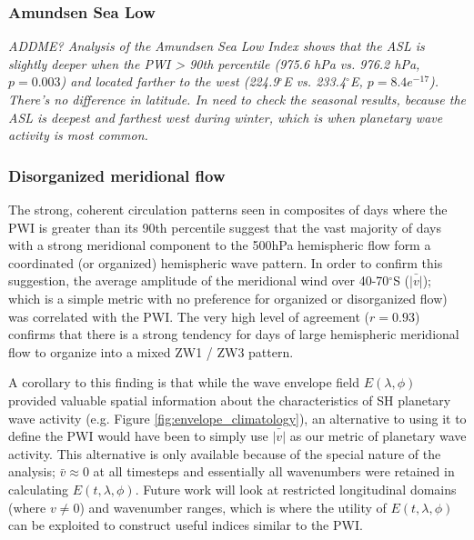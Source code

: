 \subsubsection{Amundsen Sea Low}

\textit{ADDME? Analysis of the Amundsen Sea Low Index \citep{Turner2013} shows that the ASL is slightly deeper when the PWI > 90th percentile (975.6 hPa vs. 976.2 hPa, $p = 0.003$) and located farther to the west (224.9$^{\circ}$E vs. 233.4$^{\circ}$E, $p = 8.4e^{-17}$). There's no difference in latitude.  In need to check the seasonal results, because the ASL is deepest and farthest west during winter, which is when planetary wave activity is most common.}  

\subsubsection{Disorganized meridional flow}

The strong, coherent circulation patterns seen in composites of days where the PWI is greater than its 90th percentile suggest that the vast majority of days with a strong meridional component to the 500hPa hemispheric flow form a coordinated (or organized) hemispheric wave pattern. In order to confirm this suggestion, the average amplitude of the meridional wind over 40-70$^{\circ}$S ($\bar{|v|}$); which is a simple metric with no preference for organized or disorganized flow) was correlated with the PWI. The very high level of agreement ($r = 0.93$) confirms that there is a strong tendency for days of large hemispheric meridional flow to organize into a mixed ZW1 / ZW3 pattern. 

A corollary to this finding is that while the wave envelope field $E(\lambda,\phi)$ provided valuable spatial information about the characteristics of SH planetary wave activity (e.g. Figure \ref{fig:envelope_climatology}), an alternative to using it to define the PWI would have been to simply use $\bar{|v|}$ as our metric of planetary wave activity. This alternative is only available because of the special nature of the analysis; $\bar{v} \approx 0$ at all timesteps and essentially all wavenumbers were retained in calculating $E(t,\lambda,\phi)$. Future work will look at restricted longitudinal domains (where $v \neq 0$) and wavenumber ranges, which is where the utility of $E(t,\lambda,\phi)$ can be exploited to construct useful indices similar to the PWI. 

